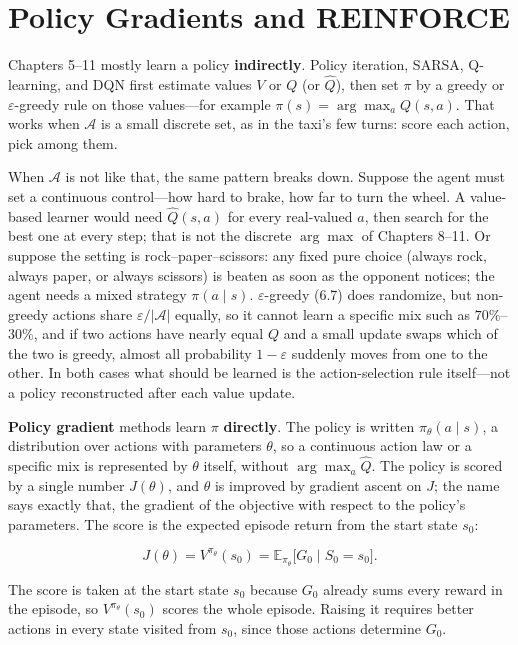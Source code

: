 \chapter{Policy Gradients and REINFORCE}

Chapters 5--11 mostly learn a policy \textbf{indirectly}. Policy iteration, SARSA, Q-learning, and DQN first estimate values $V$ or $Q$ (or $\hat{Q}$), then set $\pi$ by a greedy or $\varepsilon$-greedy rule on those values---for example $\pi(s)=\arg\max_a Q(s,a)$. That works when $\mathcal{A}$ is a small discrete set, as in the taxi's few turns: score each action, pick among them.

When $\mathcal{A}$ is not like that, the same pattern breaks down. Suppose the agent must set a continuous control---how hard to brake, how far to turn the wheel. A value-based learner would need $\hat{Q}(s,a)$ for every real-valued $a$, then search for the best one at every step; that is not the discrete $\arg\max$ of Chapters 8--11. Or suppose the setting is rock--paper--scissors: any fixed pure choice (always rock, always paper, or always scissors) is beaten as soon as the opponent notices; the agent needs a mixed strategy $\pi(a\mid s)$. $\varepsilon$-greedy (6.7) does randomize, but non-greedy actions share $\varepsilon/|\mathcal{A}|$ equally, so it cannot learn a specific mix such as $70\%$--$30\%$, and if two actions have nearly equal $Q$ and a small update swaps which of the two is greedy, almost all probability $1-\varepsilon$ suddenly moves from one to the other. In both cases what should be learned is the action-selection rule itself---not a policy reconstructed after each value update.

\textbf{Policy gradient} methods learn $\pi$ \textbf{directly}. The policy is written $\pi_\theta(a\mid s)$, a distribution over actions with parameters $\theta$, so a continuous action law or a specific mix is represented by $\theta$ itself, without $\arg\max_a\hat{Q}$. The policy is scored by a single number $J(\theta)$, and $\theta$ is improved by gradient ascent on $J$; the name says exactly that, the gradient of the objective with respect to the policy's parameters. The score is the expected episode return from the start state $s_0$:

\begin{equation}
J(\theta)
=
V^{\pi_\theta}(s_0)
=
\mathbb{E}_{\pi_\theta}\bigl[G_0\mid S_0=s_0\bigr].
\tag{9.1}
\end{equation}

The score is taken at the start state $s_0$ because $G_0$ already sums every reward in the episode, so $V^{\pi_\theta}(s_0)$ scores the whole episode. Raising it requires better actions in every state visited from $s_0$, since those actions determine $G_0$.

